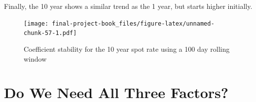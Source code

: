 \documentclass[]{book}
\theoremstyle{definition}
\theoremstyle{definition}
\theoremstyle{definition}
\theoremstyle{remark}
\begin{document}
Finally, the 10 year shows a similar trend as the 1 year, but starts
higher initially.

\begin{figure}
\centering
\texttt{[image: final-project-book\_files/figure-latex/unnamed-chunk-57-1.pdf]}
\caption{\label{fig:unnamed-chunk-57}Coefficient stability for the 10 year
spot rate using a 100 day rolling window}
\end{figure}

\hypertarget{do-we-need-all-three-factors}{%
\section{Do We Need All Three
Factors?}\label{do-we-need-all-three-factors}}


\end{document}
